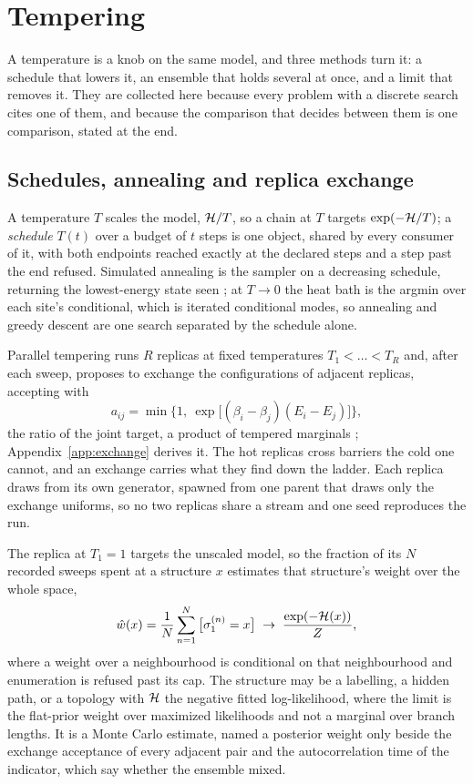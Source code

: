 \documentclass[11pt,a4paper]{article}
\begin{document}
\section{Tempering}
\label{app:tempering}
\label{sec:tempering}

A temperature is a knob on the same model, and three methods turn it: a
schedule that lowers it, an ensemble that holds several at once, and a limit
that removes it. They are collected here because every problem with a discrete
search cites one of them, and because the comparison that decides between them
is one comparison, stated at the end.

\subsection{Schedules, annealing and replica exchange}
A temperature $T$ scales the model, $\mathcal{H} / T$, so a chain at $T$ targets
$\exp(-\mathcal{H}/T)$; a \emph{schedule} $T(t)$ over a budget of $t$ steps is one
object, shared by every consumer of it, with both endpoints reached exactly at
the declared steps and a step past the end refused. Simulated annealing is the
sampler on a decreasing schedule, returning the lowest-energy state seen
\citep{kirkpatrick1983}; at $T \to 0$ the heat bath is the argmin over each
site's conditional, which is iterated conditional modes, so annealing and
greedy descent are one search separated by the schedule alone.

Parallel tempering runs $R$ replicas at fixed temperatures $T_1 < \dots < T_R$
and, after each sweep, proposes to exchange the configurations of adjacent
replicas, accepting with
\begin{equation}
  a_{ij} = \min\big\{1,\ \exp\!\big[(\beta_i - \beta_j)(E_i - E_j)\big]\big\},
  \label{eq:exchange}
\end{equation}
the ratio of the joint target, a product of tempered marginals
\citep{swendsenwang1986, geyer1991, earl2005}; Appendix~\ref{app:exchange}
derives it. The hot replicas cross barriers the cold one cannot, and an
exchange carries what they find down the ladder. Each replica draws from its
own generator, spawned from one parent that draws only the exchange uniforms,
so no two replicas share a stream and one seed reproduces the run.

The replica at $T_1 = 1$ targets the unscaled model, so the fraction of its
$N$ recorded sweeps spent at a structure $x$ estimates that structure's
weight over the whole space,
\begin{equation}
  \hat{w}(x) = \frac{1}{N} \sum_{n=1}^{N} \big[\sigma_1^{(n)} = x\big]
  \;\to\; \frac{\exp(-\mathcal{H}(x))}{Z},
  \label{eq:tempered-weight}
\end{equation}
where a weight over a neighbourhood is conditional on that neighbourhood and
enumeration is refused past its cap. The structure may be a labelling, a
hidden path, or a topology with $\mathcal{H}$ the negative fitted log-likelihood,
where the limit is the flat-prior weight over maximized likelihoods and not a
marginal over branch lengths. It is a Monte Carlo estimate, named a posterior
weight only beside the exchange acceptance of every adjacent pair and the
autocorrelation time of the indicator, which say whether the ensemble mixed.
\end{document}
